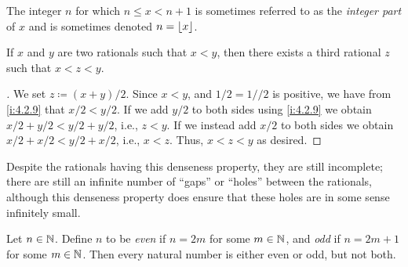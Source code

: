 \begin{rmk}\label{i:4.4.2}
  The integer \(n\) for which \(n \leq x < n + 1\) is sometimes referred to as the \emph{integer part} of \(x\) and is sometimes denoted \(n = \left\lfloor x\right\rfloor\).
\end{rmk}

\begin{prop}\label{i:4.4.3}
  If \(x\) and \(y\) are two rationals such that \(x < y\), then there exists a third rational \(z\) such that \(x < z < y\).
\end{prop}

\begin{proof}[]
  We set \(z \coloneqq (x + y) / 2\).
  Since \(x < y\), and \(1 / 2 = 1 // 2\) is positive, we have from \cref{i:4.2.9} that \(x / 2 < y / 2\).
  If we add \(y / 2\) to both sides using \cref{i:4.2.9} we obtain \(x / 2 + y / 2 < y / 2 + y / 2\), i.e., \(z < y\).
  If we instead add \(x / 2\) to both sides we obtain \(x / 2 + x / 2 < y / 2 + x / 2\), i.e., \(x < z\).
  Thus, \(x < z < y\) as desired.
\end{proof}

\begin{note}
  Despite the rationals having this denseness property, they are still incomplete;
  there are still an infinite number of ``gaps'' or ``holes'' between the rationals, although this denseness property does ensure that these holes are in some sense infinitely small.
\end{note}

\begin{ac}\label{i:ac:4.4.2}
  Let \(n \in \mathbb{N}\).
  Define \(n\) to be \emph{even} if \(n = 2m\) for some \(m \in \mathbb{N}\), and \emph{odd} if \(n = 2m + 1\) for some \(m \in \mathbb{N}\).
  Then every natural number is either even or odd, but not both.
\end{ac}

